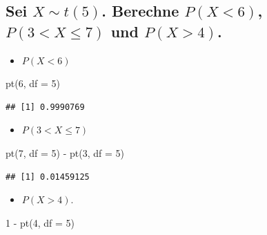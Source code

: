 \documentclass[12pt,a4paper]{article}
\newenvironment{Shaded}{\begin{snugshade}}{\end{snugshade}}
\newcommand{\AttributeTok}[1]{\textcolor[rgb]{0.77,0.63,0.00}{#1}}
\newcommand{\DecValTok}[1]{\textcolor[rgb]{0.00,0.00,0.81}{#1}}
\newcommand{\FunctionTok}[1]{\textcolor[rgb]{0.00,0.00,0.00}{#1}}
\newcommand{\NormalTok}[1]{#1}
\newcommand{\SpecialCharTok}[1]{\textcolor[rgb]{0.00,0.00,0.00}{#1}}
\begin{document}
\hypertarget{sei-xsim-t5.-berechne-px6-p3xleq7-und-px4.}{%
\subsection{\texorpdfstring{Sei \(X\sim t(5)\). Berechne \(P(X<6)\),
\(P(3<X\leq7)\) und
\(P(X>4)\).}{Sei X\textbackslash sim t(5). Berechne P(X\textless6), P(3\textless X\textbackslash leq7) und P(X\textgreater4).}}\label{sei-xsim-t5.-berechne-px6-p3xleq7-und-px4.}}

\begin{itemize}
  \item  $P(X<6)$
\end{itemize}

\begin{Shaded}
\begin{Highlighting}[]
    \FunctionTok{pt}\NormalTok{(}\DecValTok{6}\NormalTok{, }\AttributeTok{df =} \DecValTok{5}\NormalTok{)}
\end{Highlighting}
\end{Shaded}

\begin{verbatim}
## [1] 0.9990769
\end{verbatim}

\begin{itemize}
  \item  $P(3< X \leq 7)$
\end{itemize}

\begin{Shaded}
\begin{Highlighting}[]
    \FunctionTok{pt}\NormalTok{(}\DecValTok{7}\NormalTok{, }\AttributeTok{df =} \DecValTok{5}\NormalTok{) }\SpecialCharTok{{-}} \FunctionTok{pt}\NormalTok{(}\DecValTok{3}\NormalTok{, }\AttributeTok{df =} \DecValTok{5}\NormalTok{)}
\end{Highlighting}
\end{Shaded}

\begin{verbatim}
## [1] 0.01459125
\end{verbatim}

\begin{itemize}
  \item $P(X>4)$.
\end{itemize}

\begin{Shaded}
\begin{Highlighting}[]
    \DecValTok{1} \SpecialCharTok{{-}} \FunctionTok{pt}\NormalTok{(}\DecValTok{4}\NormalTok{, }\AttributeTok{df =} \DecValTok{5}\NormalTok{)}
\end{Highlighting}
\end{Shaded}
\end{document}
